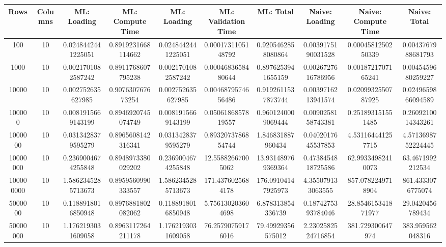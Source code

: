 \begin{table}[htb]
    \centering
    \begin{tabular}{@{}cccccccccc@{}}
        \toprule
        Rows & Columns & ML: Loading & ML: Compute Time & ML: Loading & ML: Validation Time & ML: Total & Naive: Loading & Naive: Compute Time & Naive: Total \\
        \midrule
        100 & 10 & 0.0248442441225051 & 0.8919231668114662 & 0.0248442441225051 & 0.0001731105148792 & 0.9205462858080864 & 0.0039175190031528 & 0.0004581250250339 & 0.0043767988681793 \\
        1000 & 10 & 0.0021701082587242 & 0.8911768607795238 & 0.0021701082587242 & 0.0004683658480644 & 0.8976253941655159 & 0.0026727616786956 & 0.0018721707165241 & 0.0045459680259227 \\
        10000 & 10 & 0.002752635627985 & 0.907630767673254 & 0.002752635627985 & 0.0046879574656486 & 0.9192611537873744 & 0.0039716213941574 & 0.0209932550787925 & 0.0249659866094589 \\
        100000 & 10 & 0.0081915669143199 & 0.8946920745074749 & 0.0081915669143199 & 0.0506186857819557 & 0.9601240009069444 & 0.0090258158743381 & 0.251893151551485 & 0.2609210014343261 \\
        1000000 & 10 & 0.0313428379595279 & 0.8965608142316341 & 0.0313428379595279 & 0.8932073786854744 & 1.846831887960434 & 0.0402017645537853 & 4.531164441257715 & 4.5713698752224445 \\
        10000000 & 10 & 0.2369004674255848 & 0.8948973380029202 & 0.2369004674255848 & 12.55882667005062 & 13.931489769369364 & 0.4738454818725586 & 62.99334982410073 & 63.4671992212534 \\
        100000000 & 10 & 1.5862345285713673 & 0.8959560990333557 & 1.5862345285713673 & 171.4376025684178 & 176.09104147925973 & 4.355079133063555 & 857.0782249718904 & 861.4333076775074 \\
        5000000 & 10 & 0.1188918016850948 & 0.8976881802082062 & 0.1188918016850948 & 5.756130203604698 & 6.878313854336739 & 0.1874275393784046 & 28.854615341871977 & 29.0420456789434 \\
        50000000 & 10 & 1.1762193031609058 & 0.8963117264211178 & 1.1762193031609058 & 76.25790759176016 & 79.49929356575012 & 2.2302582524716854 & 381.729300647974 & 383.959562048316 \\
        \bottomrule
    \end{tabular}
\end{table}